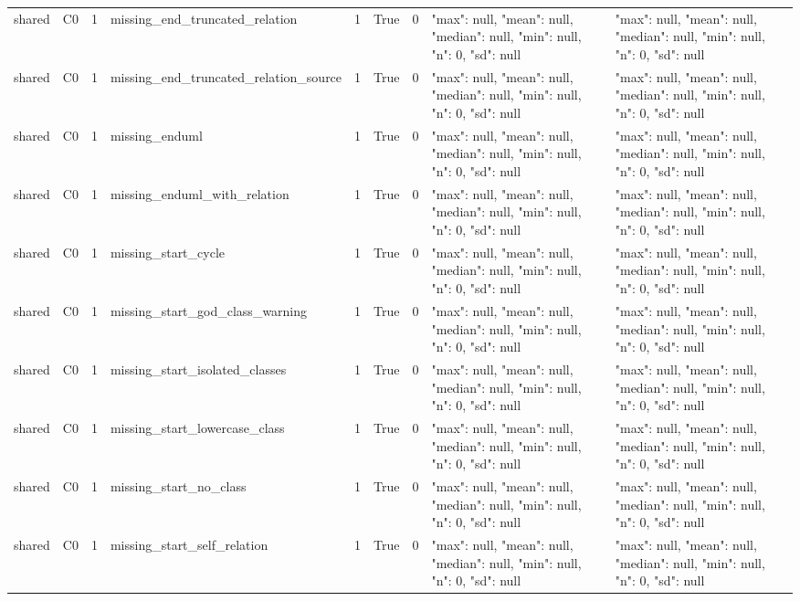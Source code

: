 \begin{tabular}{lllllllll}
shared & C0 & 1 & missing\_end\_truncated\_relation & 1 & True & 0 & {"max": null, "mean": null, "median": null, "min": null, "n": 0, "sd": null} & {"max": null, "mean": null, "median": null, "min": null, "n": 0, "sd": null} \\
shared & C0 & 1 & missing\_end\_truncated\_relation\_source & 1 & True & 0 & {"max": null, "mean": null, "median": null, "min": null, "n": 0, "sd": null} & {"max": null, "mean": null, "median": null, "min": null, "n": 0, "sd": null} \\
shared & C0 & 1 & missing\_enduml & 1 & True & 0 & {"max": null, "mean": null, "median": null, "min": null, "n": 0, "sd": null} & {"max": null, "mean": null, "median": null, "min": null, "n": 0, "sd": null} \\
shared & C0 & 1 & missing\_enduml\_with\_relation & 1 & True & 0 & {"max": null, "mean": null, "median": null, "min": null, "n": 0, "sd": null} & {"max": null, "mean": null, "median": null, "min": null, "n": 0, "sd": null} \\
shared & C0 & 1 & missing\_start\_cycle & 1 & True & 0 & {"max": null, "mean": null, "median": null, "min": null, "n": 0, "sd": null} & {"max": null, "mean": null, "median": null, "min": null, "n": 0, "sd": null} \\
shared & C0 & 1 & missing\_start\_god\_class\_warning & 1 & True & 0 & {"max": null, "mean": null, "median": null, "min": null, "n": 0, "sd": null} & {"max": null, "mean": null, "median": null, "min": null, "n": 0, "sd": null} \\
shared & C0 & 1 & missing\_start\_isolated\_classes & 1 & True & 0 & {"max": null, "mean": null, "median": null, "min": null, "n": 0, "sd": null} & {"max": null, "mean": null, "median": null, "min": null, "n": 0, "sd": null} \\
shared & C0 & 1 & missing\_start\_lowercase\_class & 1 & True & 0 & {"max": null, "mean": null, "median": null, "min": null, "n": 0, "sd": null} & {"max": null, "mean": null, "median": null, "min": null, "n": 0, "sd": null} \\
shared & C0 & 1 & missing\_start\_no\_class & 1 & True & 0 & {"max": null, "mean": null, "median": null, "min": null, "n": 0, "sd": null} & {"max": null, "mean": null, "median": null, "min": null, "n": 0, "sd": null} \\
shared & C0 & 1 & missing\_start\_self\_relation & 1 & True & 0 & {"max": null, "mean": null, "median": null, "min": null, "n": 0, "sd": null} & {"max": null, "mean": null, "median": null, "min": null, "n": 0, "sd": null} \\

\end{tabular}
